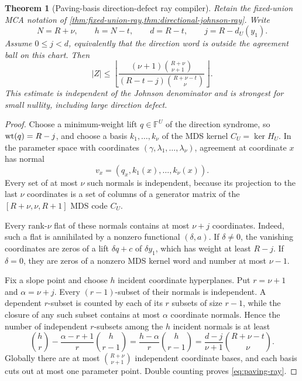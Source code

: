 \documentclass[11pt,a4paper]{amsart}
\numberwithin{equation}{section}
\newtheorem{theorem}{Theorem}[section]
\theoremstyle{remark}
\newcommand{\F}{\mathbb F}\newcommand{\B}{\mathbb B}\newcommand{\K}{\mathbb K}\newcommand{\Z}{\mathbb Z}
\begin{document}
\begin{theorem}[Paving-basis direction-defect ray compiler]
\label{thm:paving-ray}
Retain the fixed-union MCA notation of
\cref{thm:fixed-union-ray,thm:directional-johnson-ray}.  Write
\[
 N=R+\nu,
 \qquad h=N-t,
 \qquad d=R-t,
 \qquad j=R-d_U(y_1).
\]
Assume \(0\le j<d\), equivalently that the direction word is outside the
agreement ball on this chart.  Then
\begin{equation}
 |Z|\le
 \left\lfloor
 \frac{(\nu+1)\binom{R+\nu}{\nu+1}}
 {(R-t-j)\binom{R+\nu-t}{\nu}}
 \right\rfloor .
 \label{eq:paving-ray}
\end{equation}
This estimate is independent of the Johnson denominator and is strongest
for small nullity, including large direction defect.
\end{theorem}

\begin{proof}
Choose a minimum-weight lift \(q\in\F^U\) of the direction syndrome, so
\(\operatorname{wt}(q)=R-j\), and choose a basis \(k_1,\ldots,k_\nu\) of the MDS kernel
\(C_U=\ker H_U\).  In the parameter space with coordinates
\((\gamma,\lambda_1,\ldots,\lambda_\nu)\), agreement at coordinate \(x\)
has normal
\[
                       v_x=(q_x,k_1(x),\ldots,k_\nu(x)).
\]
Every set of at most \(\nu\) such normals is independent, because its
projection to the last \(\nu\) coordinates is a set of columns of a
generator matrix of the \([R+\nu,\nu,R+1]\) MDS code \(C_U\).

Every rank-\(\nu\) flat of these normals contains at most \(\nu+j\)
coordinates.  Indeed, such a flat is annihilated by a nonzero functional
\((\delta,a)\).  If \(\delta\ne0\), the vanishing coordinates are zeros of
a lift \(\delta q+c\) of \(\delta y_1\), which has weight at least
\(R-j\).  If \(\delta=0\), they are zeros of a nonzero MDS kernel word and
number at most \(\nu-1\).

Fix a slope point and choose \(h\) incident coordinate hyperplanes.  Put
\(r=\nu+1\) and \(\alpha=\nu+j\).  Every \((r-1)\)-subset of their normals
is independent.  A dependent \(r\)-subset is counted by each of its \(r\)
subsets of size \(r-1\), while the closure of any such subset contains at
most \(\alpha\) coordinate normals.  Hence the number of independent
\(r\)-subsets among the \(h\) incident normals is at least
\[
 \binom hr-\frac{\alpha-r+1}{r}\binom h{r-1}
 =\frac{h-\alpha}{r}\binom h{r-1}
 =\frac{d-j}{\nu+1}\binom{R+\nu-t}{\nu}.
\]
Globally there are at most \(\binom{R+\nu}{\nu+1}\) independent coordinate
bases, and each basis cuts out at most one parameter point.  Double
counting proves \eqref{eq:paving-ray}.
\end{proof}
\end{document}
